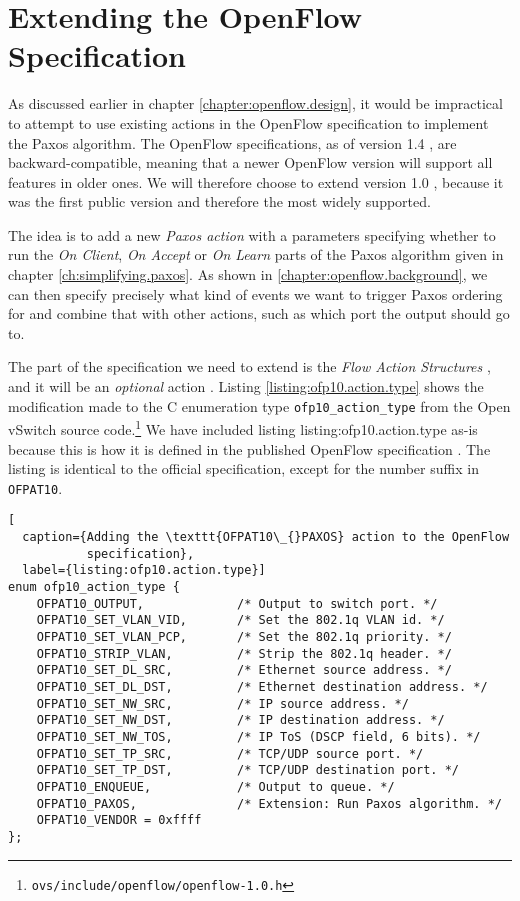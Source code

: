 \section{Extending the OpenFlow Specification}
\label{chapter:extending.openflow}

As discussed earlier in chapter \ref{chapter:openflow.design}, it would be
impractical to attempt to use existing actions in the OpenFlow specification
to implement the Paxos algorithm.
%
The OpenFlow specifications, as of version 1.4 \cite{openflow-1.4}, are
backward-compatible, meaning that a newer OpenFlow version will support all
features in older ones.  We will therefore choose to extend version 1.0
\cite{openflow-1.0}, because it was the first public version and therefore
the most widely supported.

The idea is to add a new \textit{Paxos action} with a parameters 
specifying whether to run the \textit{On Client}, \textit{On Accept} or 
\textit{On Learn} parts of the Paxos algorithm given in chapter
\vref{ch:simplifying.paxos}.
%
As shown in \vref{chapter:openflow.background}, we can then specify
precisely what kind of events we want to trigger Paxos ordering for and
combine that with other actions, such as which port the output should go to.

The part of the specification we need to extend is the 
\textit{Flow Action Structures} \cite[pp.~21--22]{openflow-1.0},
and it will be an \textit{optional} action \cite[pp.~3--6]{openflow-1.0}.
%
Listing \ref{listing:ofp10.action.type} shows the modification made to
the C enumeration type \texttt{ofp10\_{}action\_{}type} from the
Open vSwitch source
code.\footnote{\texttt{ovs/include/openflow/openflow-1.0.h}}
We have included listing listing:ofp10.action.type as-is because this is how
it is defined in the published OpenFlow specification \cite{openflow-1.0}.
%
The listing is identical to the official specification, except for the
number suffix in \texttt{OFPAT10}.

\begin{lstlisting}[
  caption={Adding the \texttt{OFPAT10\_{}PAXOS} action to the OpenFlow
           specification},
  label={listing:ofp10.action.type}]
enum ofp10_action_type {
    OFPAT10_OUTPUT,             /* Output to switch port. */
    OFPAT10_SET_VLAN_VID,       /* Set the 802.1q VLAN id. */
    OFPAT10_SET_VLAN_PCP,       /* Set the 802.1q priority. */
    OFPAT10_STRIP_VLAN,         /* Strip the 802.1q header. */
    OFPAT10_SET_DL_SRC,         /* Ethernet source address. */
    OFPAT10_SET_DL_DST,         /* Ethernet destination address. */
    OFPAT10_SET_NW_SRC,         /* IP source address. */
    OFPAT10_SET_NW_DST,         /* IP destination address. */
    OFPAT10_SET_NW_TOS,         /* IP ToS (DSCP field, 6 bits). */
    OFPAT10_SET_TP_SRC,         /* TCP/UDP source port. */
    OFPAT10_SET_TP_DST,         /* TCP/UDP destination port. */
    OFPAT10_ENQUEUE,            /* Output to queue. */
    OFPAT10_PAXOS,              /* Extension: Run Paxos algorithm. */
    OFPAT10_VENDOR = 0xffff
};
\end{lstlisting}

